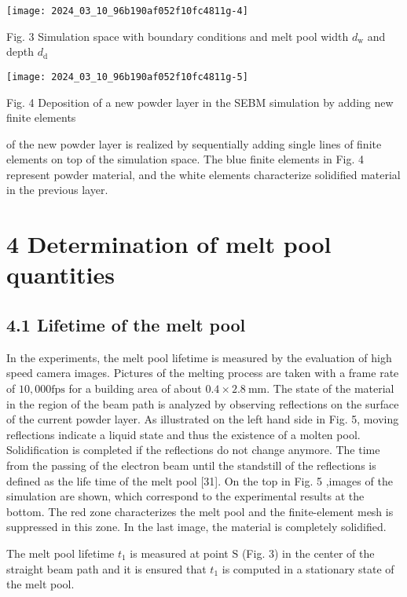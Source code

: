 \documentclass[10pt]{article}
\begin{document}
\begin{center}
\texttt{[image: 2024\_03\_10\_96b190af052f10fc4811g-4]}
\end{center}

Fig. 3 Simulation space with boundary conditions and melt pool width $d_{\mathrm{w}}$ and depth $d_{\mathrm{d}}$

\begin{center}
\texttt{[image: 2024\_03\_10\_96b190af052f10fc4811g-5]}
\end{center}

Fig. 4 Deposition of a new powder layer in the SEBM simulation by adding new finite elements

of the new powder layer is realized by sequentially adding single lines of finite elements on top of the simulation space. The blue finite elements in Fig. 4 represent powder material, and the white elements characterize solidified material in the previous layer.

\section*{4 Determination of melt pool quantities}
\subsection*{4.1 Lifetime of the melt pool}
In the experiments, the melt pool lifetime is measured by the evaluation of high speed camera images. Pictures of the melting process are taken with a frame rate of $10,000 \mathrm{fps}$ for a building area of about $0.4 \times 2.8 \mathrm{~mm}$. The state of the material in the region of the beam path is analyzed by observing reflections on the surface of the current powder layer. As illustrated on the left hand side in Fig. 5, moving reflections indicate a liquid state and thus the existence of a molten pool. Solidification is completed if the reflections do not change anymore. The time from the passing of the electron beam until the standstill of the reflections is defined as the life time of the melt pool [31]. On the top in Fig. 5 ,images of the simulation are shown, which correspond to the experimental results at the bottom. The red zone characterizes the melt pool and the finite-element mesh is suppressed in this zone. In the last image, the material is completely solidified.

The melt pool lifetime $t_{1}$ is measured at point $\mathrm{S}$ (Fig. 3) in the center of the straight beam path and it is ensured that $t_{1}$ is computed in a stationary state of the melt pool.
\end{document}
